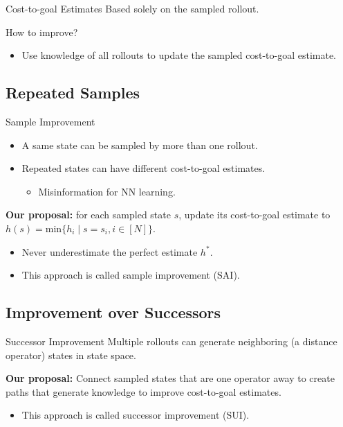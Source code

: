 \documentclass[10pt]{beamer}
\providecommand{\hvalue}[1]{\ensuremath{h^{#1}}\xspace}
\providecommand{\hstar}{\hvalue{*}}
\begin{document}
\begin{frame}{Cost-to-goal Estimates}
Based solely on the sampled rollout.

\bigskip

How to improve?
\begin{itemize}
    \item Use knowledge of all rollouts to update the sampled cost-to-goal estimate.
\end{itemize}
\end{frame}

\subsection{Repeated Samples}

\begin{frame}{Sample Improvement}
\begin{itemize}
    \item A same state can be sampled by more than one rollout.
    \item Repeated states can have different cost-to-goal estimates.
    \begin{itemize}
        \item Misinformation for NN learning.
    \end{itemize}
\end{itemize}

\bigskip

\textbf{Our proposal:} for each sampled state $s$, update its cost-to-goal estimate to $h(s) = \text{min}\{h_i \mid s=s_i, i\in[N]\}$.
\begin{itemize}
    \item Never underestimate the perfect estimate \hstar.
    \item This approach is called \alert{sample improvement} (SAI).
\end{itemize}
\end{frame}

\subsection{Improvement over Successors}

\begin{frame}{Successor Improvement}
Multiple rollouts can generate neighboring (a distance operator) states in state space.

\bigskip
    
\textbf{Our proposal:} Connect sampled states that are one operator away to create paths that generate knowledge to improve cost-to-goal estimates.
\begin{itemize}
    \item This approach is called \alert{successor improvement} (SUI).
\end{itemize}
\end{frame}
\end{document}
